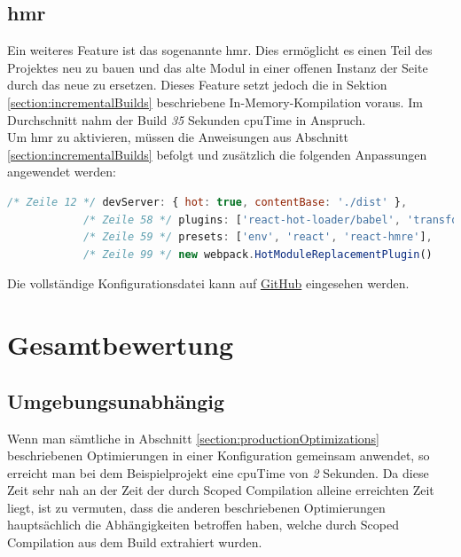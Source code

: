 \documentclass[11pt]{report}
\begin{document}
    		\subsection{\Gls{hmr}}
    			Ein weiteres Feature ist das sogenannte \Gls{hmr}. Dies ermöglicht es einen Teil des Projektes neu zu bauen und das alte Modul in einer offenen Instanz der Seite durch das neue zu ersetzen. Dieses Feature setzt jedoch die in Sektion \ref{section:incrementalBuilds} beschriebene In-Memory-Kompilation voraus. Im Durchschnitt nahm der Build \emph{35} Sekunden \Gls{cpuTime} in Anspruch.\\
    			Um \Gls{hmr} zu aktivieren, müssen die Anweisungen aus Abschnitt \ref{section:incrementalBuilds} befolgt und zusätzlich die folgenden Anpassungen angewendet werden:\\
    			\begin{center}
		        	\begin{lstlisting}[language=JavaScript]
			/* Zeile 12 */ devServer: { hot: true, contentBase: './dist' },
			/* Zeile 58 */ plugins: ['react-hot-loader/babel', 'transform-class-properties'],
			/* Zeile 59 */ presets: ['env', 'react', 'react-hmre'],
			/* Zeile 99 */ new webpack.HotModuleReplacementPlugin()
		        	\end{lstlisting}
	        	\end{center}
    			Die vollständige Konfigurationsdatei kann auf \href{https://github.com/TexNAK/WebBundlerOptimization/commit/4a1cadbe86cc305bafeb9f7d56733fc90b0f514a#diff-1fb5683b1e7adbcee273b7f9f9a08a22}{GitHub} eingesehen werden.

		\section{Gesamtbewertung}
			\subsection{Umgebungsunabhängig}
				Wenn man sämtliche in Abschnitt \ref{section:productionOptimizations} beschriebenen Optimierungen in einer Konfiguration gemeinsam anwendet, so erreicht man bei dem Beispielprojekt eine \Gls{cpuTime} von \emph{2} Sekunden. Da diese Zeit sehr nah an der Zeit der durch Scoped Compilation alleine erreichten Zeit liegt, ist zu vermuten, dass die anderen beschriebenen Optimierungen hauptsächlich die Abhängigkeiten betroffen haben, welche durch Scoped Compilation aus dem Build extrahiert wurden.
\end{document}
